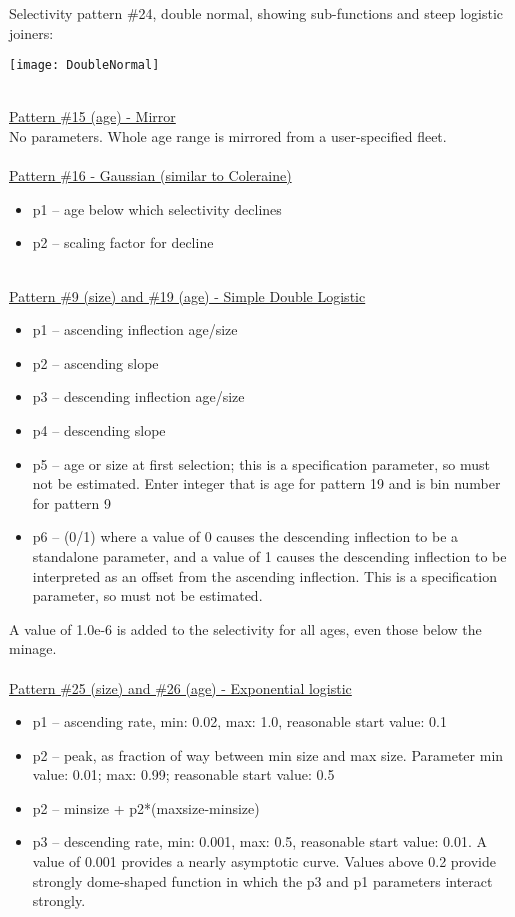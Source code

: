 Selectivity pattern \#24, double normal, showing sub-functions and steep logistic joiners:
\begin{center}
	\texttt{[image: DoubleNormal]}
\end{center}
\hfil
\\
\underline{Pattern \#15 (age) - Mirror}\\
No parameters.  Whole age range is mirrored from a user-specified fleet.\\
\hfil
\\
\underline{Pattern \#16 - Gaussian (similar to Coleraine)}
\begin{itemize}
	\item p1 – age below which selectivity declines
	\item p2 – scaling factor for decline
\end{itemize}
\hfil
\\
\underline{Pattern \#9 (size) and \#19 (age) - Simple Double Logistic}
\begin{itemize}
	\item p1 – ascending inflection age/size
	\item p2 – ascending slope
	\item p3 – descending inflection age/size
	\item p4 – descending slope
	\item p5 – age or size at first selection; this is a specification parameter, so must not be estimated.  Enter integer that is age for pattern 19 and is bin number for pattern 9
	\item p6 – (0/1)  where a value of 0 causes the descending inflection to be a standalone parameter, and a value of 1 causes the descending inflection to be interpreted as an offset from the ascending inflection.  This is a specification parameter, so must not be estimated.
\end{itemize}
A value of 1.0e-6 is added to the selectivity for all ages, even those below the minage.\\
\hfil
\\
\underline{Pattern \#25 (size) and \#26 (age) - Exponential logistic}
\begin{itemize}
	\item p1 – ascending rate, min: 0.02, max: 1.0, reasonable start value:  0.1
	\item p2 – peak, as fraction of way between min size and max size.  Parameter min value:  0.01; max:  0.99; reasonable start value:  0.5
	\item p2 – minsize + p2*(maxsize-minsize)
	\item p3 – descending rate, min: 0.001, max: 0.5, reasonable start value:  0.01.  A value of 0.001 provides a nearly asymptotic curve.  Values above 0.2 provide strongly dome-shaped function in which the p3 and p1 parameters interact strongly.
\end{itemize}
